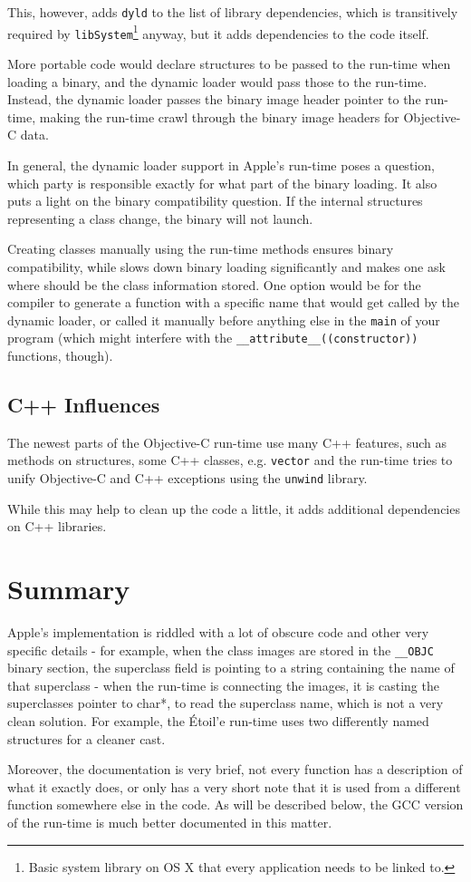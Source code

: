 This, however, adds \verb=dyld= to the list of library dependencies, which is transitively required by \verb=libSystem=\footnote{Basic system library on OS X that every application needs to be linked to.} anyway, but it adds dependencies to the code itself.

More portable code would declare structures to be passed to the run-time when loading a binary, and the dynamic loader would pass those to the run-time. Instead, the dynamic loader passes the binary image header pointer to the run-time, making the run-time crawl through the binary image headers for Objective-C data.

In general, the dynamic loader support in Apple's run-time poses a question, which party is responsible exactly for what part of the binary loading. It also puts a light on the binary compatibility question. If the internal structures representing a class change, the binary will not launch.

Creating classes manually using the run-time methods ensures binary compatibility, while slows down binary loading significantly and makes one ask where should be the class information stored. One option would be for the compiler to generate a function with a specific name that would get called by the dynamic loader, or called it manually before anything else in the \verb=main= of your program (which might interfere with the \verb=__attribute__((constructor))= functions, though).

\subsection{C++ Influences}
The newest parts of the Objective-C run-time use many C++ features, such as methods on structures, some C++ classes, e.g. \verb=vector= and the run-time tries to unify Objective-C and C++ exceptions using the \verb=unwind= library.

While this may help to clean up the code a little, it adds additional dependencies on C++ libraries.

\section{Summary}
Apple's implementation is riddled with a lot of obscure code and other very specific details - for example, when the class images are stored in the \verb=__OBJC= binary section, the superclass field is pointing to a string containing the name of that superclass - when the run-time is connecting the images, it is casting the superclasses pointer to char*, to read the superclass name, which is not a very clean solution. For example, the \'Etoil'e run-time uses two differently named structures for a cleaner cast. 

Moreover, the documentation is very brief, not every function has a description of what it exactly does, or only has a very short note that it is used from a different function somewhere else in the code. As will be described below, the GCC version of the run-time is much better documented in this matter.
